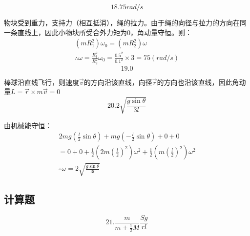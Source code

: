 \documentclass[blue, normal]{./templete/qyxfnote}
\begin{document}
\begin{multicols}{2}
			\[18.75rad/s\]\par
			物块受到重力，支持力（相互抵消），绳的拉力。由于绳的向径与拉力的方向在同一条直线上，因此小物块所受合外力矩为0，角动量守恒。则：
			\begin{gather*}
			(mR_1^2)\omega_0=(mR_2^2)\omega\\
			\therefore \omega=\frac{R_1^2}{R_2^2}\omega_0=\frac{0.5^2}{0.1^2}\times 3=75(rad/s)
			\end{gather*}
			\[19.0\]\par
			棒球沿直线飞行，则速度$ \vec{v} $的方向沿该直线，向径$ \vec{r} $的方向也沿该直线，因此角动量$ L=\vec{r}\times m\vec{v}=0 $
			\[20.2\sqrt{\frac{g\sin\theta}{3l}}\]\par
			由机械能守恒：
			\begin{gather*}
			\hspace{1pt}2mg\left(\frac{l}{2}\sin\theta\right)+mg\left(-\frac{l}{2}\sin\theta\right)+0+0\\
			=0+0+\frac{1}{2}\left(2m\left(\frac{l}{2}\right)^2\right)\omega^2+\frac{1}{2}\left(m\left(\frac{l}{2}\right)^2\right)\omega^2\\
			\therefore \omega=2\sqrt{\frac{g\sin\theta}{3l}}
			\end{gather*}

		\subsection{计算题}
			\[21.\frac{m}{m+\frac{1}{2}M}\frac{Sg}{rl}\] 
			

\end{multicols}
\end{document}
